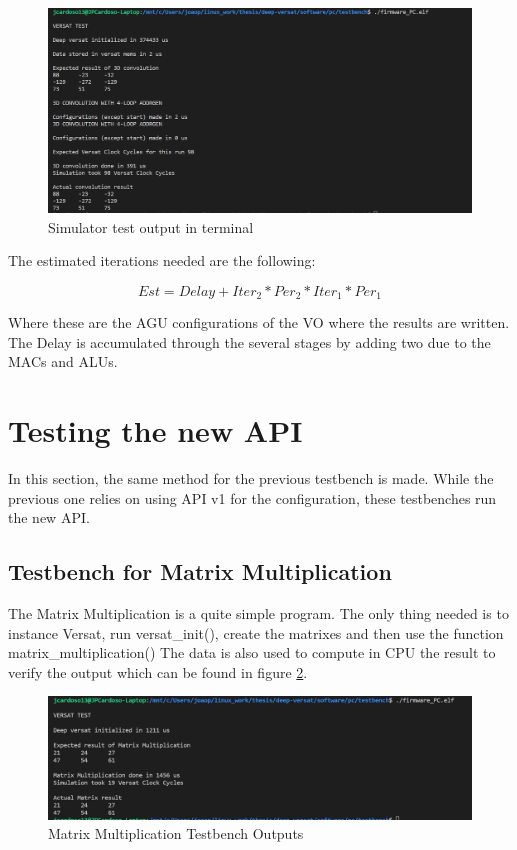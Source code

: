 \begin{figure}[!htbp]
    \centering
    \includegraphics[width=\textwidth]{Figures/test1.png}
    \caption{Simulator test output in terminal}
    \label{figure:test1}
\end{figure} 

The estimated iterations needed are the following:

\[ Est=Delay+Iter_2*Per_2*Iter_1*Per_1\]

Where these are the AGU configurations of the VO where the results are written. The Delay is accumulated
through the several stages by adding two due to the MACs and ALUs.

\section{Testing the new API}
\label{section:testgencov}

In this section, the same method for the previous testbench is made. 
While the previous one relies on using API v1 for the configuration, these testbenches
run the new API. 

\subsection{Testbench for Matrix Multiplication}

The Matrix Multiplication is a quite simple program. The only thing needed is to instance
Versat, run versat\_init(), create the matrixes and then use the function matrix\_multiplication()
The data is also used to compute in CPU the result to verify the output which can be found in
figure \ref{figure:test2}.

\begin{figure}[!htbp]
    \centering
    \includegraphics[width=\textwidth]{Figures/test2.png}
    \caption{Matrix Multiplication Testbench Outputs}
    \label{figure:test2}
\end{figure}

